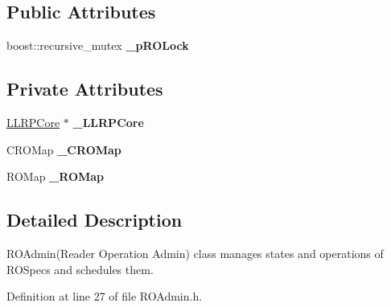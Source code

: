 \subsection*{Public Attributes}
\begin{DoxyCompactItemize}
\item 
\hypertarget{class_e_l_f_i_n_1_1_r_o_admin_a55acaa533d684c69d09d63f42036de96}{boost\-::recursive\-\_\-mutex {\bfseries \-\_\-p\-R\-O\-Lock}}\label{class_e_l_f_i_n_1_1_r_o_admin_a55acaa533d684c69d09d63f42036de96}

\end{DoxyCompactItemize}
\subsection*{Private Attributes}
\begin{DoxyCompactItemize}
\item 
\hypertarget{class_e_l_f_i_n_1_1_r_o_admin_a561ca8590aa2b6fb5c455f50a6e019ff}{\hyperlink{class_e_l_f_i_n_1_1_l_l_r_p_core}{L\-L\-R\-P\-Core} $\ast$ {\bfseries \-\_\-\-L\-L\-R\-P\-Core}}\label{class_e_l_f_i_n_1_1_r_o_admin_a561ca8590aa2b6fb5c455f50a6e019ff}

\item 
\hypertarget{class_e_l_f_i_n_1_1_r_o_admin_a545e47eaadc651c1c3b39d3ad7c52100}{C\-R\-O\-Map {\bfseries \-\_\-\-C\-R\-O\-Map}}\label{class_e_l_f_i_n_1_1_r_o_admin_a545e47eaadc651c1c3b39d3ad7c52100}

\item 
\hypertarget{class_e_l_f_i_n_1_1_r_o_admin_ad4e00e91b1a3d52196cb6e20a07d86c8}{R\-O\-Map {\bfseries \-\_\-\-R\-O\-Map}}\label{class_e_l_f_i_n_1_1_r_o_admin_ad4e00e91b1a3d52196cb6e20a07d86c8}

\end{DoxyCompactItemize}


\subsection{Detailed Description}
R\-O\-Admin(\-Reader Operation Admin) class manages states and operations of R\-O\-Specs and schedules them. 

Definition at line 27 of file R\-O\-Admin.\-h.



